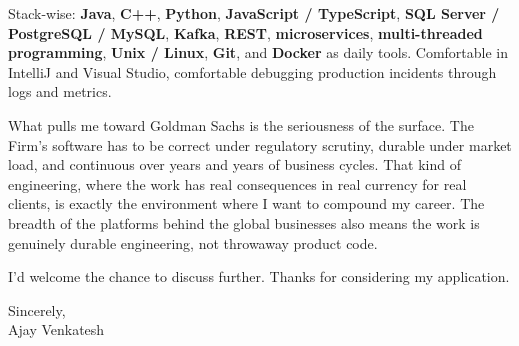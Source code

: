 \documentclass[letterpaper,11pt]{article}
\begin{document}
Stack-wise: \textbf{Java}, \textbf{C++}, \textbf{Python}, \textbf{JavaScript / TypeScript}, \textbf{SQL Server / PostgreSQL / MySQL}, \textbf{Kafka}, \textbf{REST}, \textbf{microservices}, \textbf{multi-threaded programming}, \textbf{Unix / Linux}, \textbf{Git}, and \textbf{Docker} as daily tools. Comfortable in IntelliJ and Visual Studio, comfortable debugging production incidents through logs and metrics.

What pulls me toward Goldman Sachs is the seriousness of the surface. The Firm's software has to be correct under regulatory scrutiny, durable under market load, and continuous over years and years of business cycles. That kind of engineering, where the work has real consequences in real currency for real clients, is exactly the environment where I want to compound my career. The breadth of the platforms behind the global businesses also means the work is genuinely durable engineering, not throwaway product code.

I'd welcome the chance to discuss further. Thanks for considering my application.

\vspace{12pt}
Sincerely, \\
Ajay Venkatesh
\end{document}
